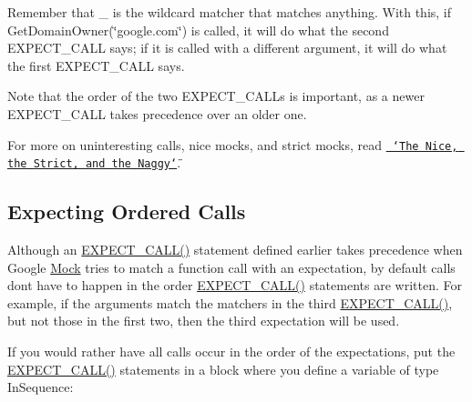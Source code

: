 \begin{DoxyCode}{0}
\end{DoxyCode}


Remember that {\ttfamily \+\_\+} is the wildcard matcher that matches anything. With this, if {\ttfamily Get\+Domain\+Owner(\char`\"{}google.\+com\char`\"{})} is called, it will do what the second {\ttfamily E\+X\+P\+E\+C\+T\+\_\+\+C\+A\+LL} says; if it is called with a different argument, it will do what the first {\ttfamily E\+X\+P\+E\+C\+T\+\_\+\+C\+A\+LL} says.

Note that the order of the two {\ttfamily E\+X\+P\+E\+C\+T\+\_\+\+C\+A\+L\+Ls} is important, as a newer {\ttfamily E\+X\+P\+E\+C\+T\+\_\+\+C\+A\+LL} takes precedence over an older one.

For more on uninteresting calls, nice mocks, and strict mocks, read \href{\#the-nice-the-strict-and-the-naggy}{\texttt{ \char`\"{}\+The Nice, the Strict, and the Naggy\char`\"{}}}.

\subsection*{Expecting Ordered Calls}

Although an {\ttfamily \mbox{\hyperlink{gmock-spec-builders_8h_a535a6156de72c1a2e25a127e38ee5232}{E\+X\+P\+E\+C\+T\+\_\+\+C\+A\+L\+L()}}} statement defined earlier takes precedence when Google \mbox{\hyperlink{classMock}{Mock}} tries to match a function call with an expectation, by default calls don\textquotesingle{}t have to happen in the order {\ttfamily \mbox{\hyperlink{gmock-spec-builders_8h_a535a6156de72c1a2e25a127e38ee5232}{E\+X\+P\+E\+C\+T\+\_\+\+C\+A\+L\+L()}}} statements are written. For example, if the arguments match the matchers in the third {\ttfamily \mbox{\hyperlink{gmock-spec-builders_8h_a535a6156de72c1a2e25a127e38ee5232}{E\+X\+P\+E\+C\+T\+\_\+\+C\+A\+L\+L()}}}, but not those in the first two, then the third expectation will be used.

If you would rather have all calls occur in the order of the expectations, put the {\ttfamily \mbox{\hyperlink{gmock-spec-builders_8h_a535a6156de72c1a2e25a127e38ee5232}{E\+X\+P\+E\+C\+T\+\_\+\+C\+A\+L\+L()}}} statements in a block where you define a variable of type {\ttfamily In\+Sequence}\+:



